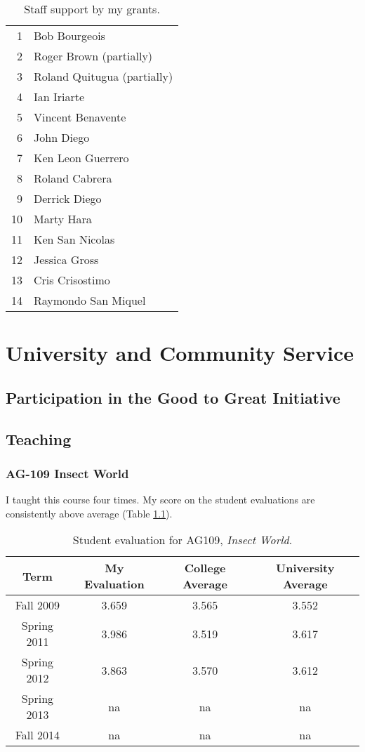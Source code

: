 \documentclass[12pt,oneside,english]{scrbook}
\begin{document}
\pagebreak{}

\begin{longtable}{r>{\raggedright}p{5cm}}
\caption{\label{tab:Staff-support-by-my-grants}Staff support by my grants.}
\tabularnewline
\endfirsthead
\midrule 
1 &
 Bob Bourgeois\tabularnewline
2 &
 Roger Brown (partially)\tabularnewline
3 &
 Roland Quitugua (partially)\tabularnewline
4 &
 Ian Iriarte\tabularnewline
5 &
 Vincent Benavente\tabularnewline
6 &
 John Diego\tabularnewline
7 &
 Ken Leon Guerrero\tabularnewline
8 &
 Roland Cabrera\tabularnewline
9 &
 Derrick Diego\tabularnewline
10 &
 Marty Hara\tabularnewline
11 &
 Ken San Nicolas\tabularnewline
12 &
 Jessica Gross\tabularnewline
13 &
Cris Crisostimo\tabularnewline
14 &
Raymondo San Miquel\tabularnewline
\bottomrule
\end{longtable}

\chapter{University and Community Service}

\section{Participation in the Good to Great Initiative}

\section{Teaching }

\subsection{AG-109 Insect World}

I taught this course four times. My score on the student evaluations
are consistently above average (Table \ref{tab:Student-evaluation}).

\begin{table}[h]
\protect\caption{\label{tab:Student-evaluation}Student evaluation for AG109, \emph{Insect World}.}
\centering{}%
\begin{tabular}{cccc}
\hline 
Term & My Evaluation & College Average & University Average\tabularnewline
\hline 
Fall 2009   & 3.659 & 3.565 & 3.552\tabularnewline
Spring 2011 & 3.986 & 3.519 & 3.617\tabularnewline
Spring 2012 & 3.863 & 3.570 & 3.612\tabularnewline
Spring 2013 & na    & na    & na   \tabularnewline
Fall 2014 	& na    & na    & na   \tabularnewline   
\hline 
\end{tabular}
\end{table}
\end{document}

